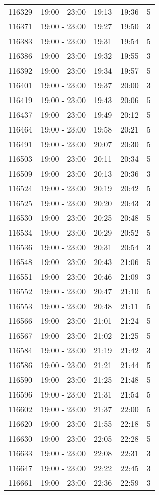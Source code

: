 \documentclass{article}
\begin{document}
\begin{tabular}{llccc}
116329 & 19:00 - 23:00 & 19:13 & 19:36 & 5 \\
116371 & 19:00 - 23:00 & 19:27 & 19:50 & 3 \\
116383 & 19:00 - 23:00 & 19:31 & 19:54 & 5 \\
116386 & 19:00 - 23:00 & 19:32 & 19:55 & 3 \\
116392 & 19:00 - 23:00 & 19:34 & 19:57 & 5 \\
116401 & 19:00 - 23:00 & 19:37 & 20:00 & 3 \\
116419 & 19:00 - 23:00 & 19:43 & 20:06 & 5 \\
116437 & 19:00 - 23:00 & 19:49 & 20:12 & 5 \\
116464 & 19:00 - 23:00 & 19:58 & 20:21 & 5 \\
116491 & 19:00 - 23:00 & 20:07 & 20:30 & 5 \\
116503 & 19:00 - 23:00 & 20:11 & 20:34 & 5 \\
116509 & 19:00 - 23:00 & 20:13 & 20:36 & 3 \\
116524 & 19:00 - 23:00 & 20:19 & 20:42 & 5 \\
116525 & 19:00 - 23:00 & 20:20 & 20:43 & 3 \\
116530 & 19:00 - 23:00 & 20:25 & 20:48 & 5 \\
116534 & 19:00 - 23:00 & 20:29 & 20:52 & 5 \\
116536 & 19:00 - 23:00 & 20:31 & 20:54 & 3 \\
116548 & 19:00 - 23:00 & 20:43 & 21:06 & 5 \\
116551 & 19:00 - 23:00 & 20:46 & 21:09 & 3 \\
116552 & 19:00 - 23:00 & 20:47 & 21:10 & 5 \\
116553 & 19:00 - 23:00 & 20:48 & 21:11 & 5 \\
116566 & 19:00 - 23:00 & 21:01 & 21:24 & 5 \\
116567 & 19:00 - 23:00 & 21:02 & 21:25 & 5 \\
116584 & 19:00 - 23:00 & 21:19 & 21:42 & 3 \\
116586 & 19:00 - 23:00 & 21:21 & 21:44 & 5 \\
116590 & 19:00 - 23:00 & 21:25 & 21:48 & 5 \\
116596 & 19:00 - 23:00 & 21:31 & 21:54 & 5 \\
116602 & 19:00 - 23:00 & 21:37 & 22:00 & 5 \\
116620 & 19:00 - 23:00 & 21:55 & 22:18 & 5 \\
116630 & 19:00 - 23:00 & 22:05 & 22:28 & 5 \\
116633 & 19:00 - 23:00 & 22:08 & 22:31 & 3 \\
116647 & 19:00 - 23:00 & 22:22 & 22:45 & 3 \\
116661 & 19:00 - 23:00 & 22:36 & 22:59 & 3 \\
\bottomrule
\end{tabular}
\end{document}

